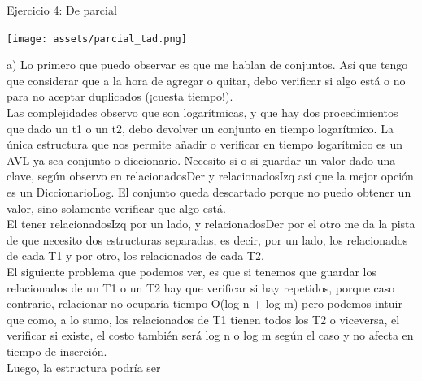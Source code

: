 \documentclass[10pt,a4paper]{article}
\begin{document}
Ejercicio 4: De parcial 
\begin{center}
    \begin{minipage}[b]{0.8\textwidth}
        \texttt{[image: assets/parcial\_tad.png]}
        \centering
        \label{fig:parcial_tad}
    \end{minipage}
\end{center}
a) Lo primero que puedo observar es que me hablan de conjuntos. Así que tengo que considerar que a la hora de agregar o quitar, debo verificar si algo está o no para no aceptar duplicados (¡cuesta tiempo!). \\ 
Las complejidades observo que son logarítmicas, y que hay dos procedimientos que dado un t1 o un t2, debo devolver un conjunto en tiempo logarítmico. La única estructura que nos permite añadir o verificar en tiempo logarítmico es un AVL ya sea conjunto o diccionario. Necesito si o si guardar un valor dado una clave, según observo en relacionadosDer y relacionadosIzq así que la mejor opción es un DiccionarioLog. El conjunto queda descartado porque no puedo obtener un valor, sino solamente verificar que algo está. \\
El tener relacionadosIzq por un lado, y relacionadosDer por el otro me da la pista de que necesito dos estructuras separadas, es decir, por un lado, los relacionados de cada T1 y por otro, los relacionados de cada T2. \\
El siguiente problema que podemos ver, es que si tenemos que guardar los relacionados de un T1 o un T2 hay que verificar si hay repetidos, porque caso contrario, relacionar no ocuparía tiempo O(log n + log m) pero podemos intuir que como, a lo sumo, los relacionados de T1 tienen todos los T2 o viceversa, el verificar si existe, el costo también será log n o log m según el caso y no afecta en tiempo de inserción. \\
Luego, la estructura podría ser
\end{document}
